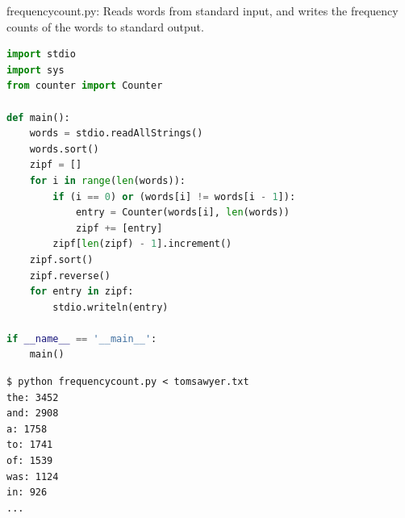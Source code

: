 \documentclass[8pt,a4paper,compress,handout]{beamer}
\begin{document}
\begin{frame}[fragile]
\begin{framed}
\tiny frequencycount.py: Reads words from standard input, and writes the frequency counts of the words to standard output.
\end{framed}

\begin{lstlisting}[language=Python]
import stdio
import sys
from counter import Counter

def main():
    words = stdio.readAllStrings()
    words.sort()
    zipf = []
    for i in range(len(words)):
        if (i == 0) or (words[i] != words[i - 1]):
            entry = Counter(words[i], len(words))
            zipf += [entry]
        zipf[len(zipf) - 1].increment()
    zipf.sort()
    zipf.reverse()
    for entry in zipf:
        stdio.writeln(entry)

if __name__ == '__main__':
    main()
\end{lstlisting}

\begin{lstlisting}[language={}]
$ python frequencycount.py < tomsawyer.txt
the: 3452
and: 2908
a: 1758
to: 1741
of: 1539
was: 1124
in: 926
...
\end{lstlisting}
\end{frame}
\end{document}
